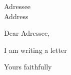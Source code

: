 \documentclass{letter}
\begin{document}
\begin{letter}{Adressee \\ Address}
\opening{Dear Adressee,}
I am writing a letter
\lipsum[1-10]
\closing{Yours faithfully}
\end{letter}
\end{document}
